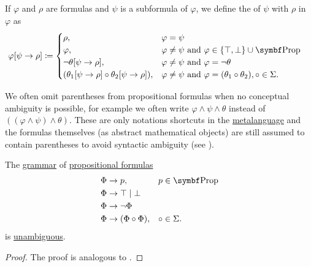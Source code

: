 \begin{Definition}\label{def:propositional_substition}
  If \( \varphi \) and \( \rho \) are formulas and \( \psi \) is a subformula of \( \varphi \), we define the  of \( \psi \) with \( \rho \) in \( \varphi \) as
  \begin{align*}
    \varphi[\psi \to \rho] &\coloneqq \begin{cases}
      \rho,                                                    &\varphi = \psi \\
      \varphi,                                                 &\varphi \neq \psi \text{ and } \varphi \in \{ \top, \bot \} \cup \Bold{Prop} \\
      \neg \theta[\psi \to \rho],                              &\varphi \neq \psi \text{ and } \varphi = \neg \theta \\
      (\theta_1[\psi \to \rho] \circ \theta_2[\psi \to \rho]), &\varphi \neq \psi \text{ and } \varphi = (\theta_1 \circ \theta_2), \circ \in \Sigma.
    \end{cases}
  \end{align*}
\end{Definition}

\begin{Remark}\label{remark:propositional_formula_parentheses}
  We often omit parentheses from propositional formulas when no conceptual ambiguity is possible, for example we often write \( \varphi \wedge \psi \wedge \theta \) instead of \( ((\varphi \wedge \psi) \wedge \theta) \). These are only notations shortcuts in the \hyperref[remark:metalanguage]{metalanguage} and the formulas themselves (as abstract mathematical objects) are still assumed to contain parentheses to avoid syntactic ambiguity (see ).
\end{Remark}

\begin{Proposition}\label{thm:propositional_formulas_are_unambiguous}
  The \hyperref[def:grammar]{grammar} of \hyperref[def:propositional_language]{propositional formulas}
  \begin{displaymath}
    \begin{aligned}
      &\Phi \to p,                 &&p \in \Bold{Prop} \\
      &\Phi \to \top \;|\; \bot    && \\
      &\Phi \to \neg \Phi          && \\
      &\Phi \to (\Phi \circ \Phi), &&\circ \in \Sigma.
    \end{aligned}
  \end{displaymath}
  is \hyperref[def:ambiguous_grammar]{unambiguous}.
\end{Proposition}
\begin{proof}
  The proof is analogous to .
\end{proof}

